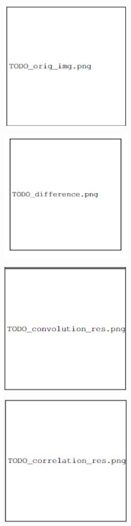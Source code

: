 \documentclass[11pt]{article}
\begin{document}
\begin{enumerate}[(a)]
\begin{tcolorbox}[colback=white!5!white,colframe=green!75!black,breakable]
    \includegraphics[width=0.5\textwidth,height=7cm,keepaspectratio]{images/TODO_orig_img.png}
    \includegraphics[width=0.5\textwidth,height=7cm,keepaspectratio]{images/TODO_difference.png}\\
    \includegraphics[width=0.5\textwidth,height=7cm,keepaspectratio]{images/TODO_convolution_res.png}
    \includegraphics[width=0.5\textwidth,height=7cm,keepaspectratio]{images/TODO_correlation_res.png}
    

\end{tcolorbox}
\end{enumerate}
\end{document}

